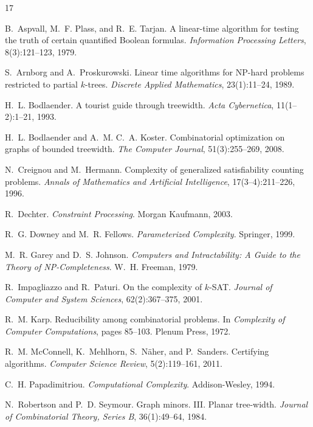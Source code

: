 \documentclass[11pt]{article}
\theoremstyle{plain}
\theoremstyle{definition}
\theoremstyle{remark}
\begin{document}
\begin{thebibliography}{17}

 B.~Aspvall, M.~F. Plass, and R.~E. Tarjan.
A linear-time algorithm for testing the truth of certain quantified Boolean
formulas. \emph{Information Processing Letters}, 8(3):121--123, 1979.

 S.~Arnborg and A.~Proskurowski.
Linear time algorithms for NP-hard problems restricted to partial $k$-trees.
\emph{Discrete Applied Mathematics}, 23(1):11--24, 1989.

 H.~L. Bodlaender.
A tourist guide through treewidth. \emph{Acta Cybernetica},
11(1--2):1--21, 1993.

 H.~L. Bodlaender and A.~M. C.~A. Koster.
Combinatorial optimization on graphs of bounded treewidth.
\emph{The Computer Journal}, 51(3):255--269, 2008.

 N.~Creignou and M.~Hermann.
Complexity of generalized satisfiability counting problems.
\emph{Annals of Mathematics and Artificial Intelligence}, 17(3--4):211--226,
1996.

 R.~Dechter. \emph{Constraint Processing}.
Morgan Kaufmann, 2003.

 R.~G. Downey and M.~R. Fellows.
\emph{Parameterized Complexity}. Springer, 1999.

 M.~R. Garey and D.~S. Johnson.
\emph{Computers and Intractability: A Guide to the Theory of
NP-Completeness}. W.~H. Freeman, 1979.

 R.~Impagliazzo and R.~Paturi.
On the complexity of $k$-SAT. \emph{Journal of Computer and System
Sciences}, 62(2):367--375, 2001.

 R.~M. Karp. Reducibility among combinatorial problems.
In \emph{Complexity of Computer Computations}, pages 85--103. Plenum Press,
1972.

 R.~M. McConnell, K.~Mehlhorn, S.~N\"aher, and P.~Sanders.
Certifying algorithms. \emph{Computer Science Review}, 5(2):119--161, 2011.

 C.~H. Papadimitriou. \emph{Computational
Complexity}. Addison-Wesley, 1994.

 N.~Robertson and P.~D. Seymour.
Graph minors. III. Planar tree-width. \emph{Journal of Combinatorial Theory,
Series B}, 36(1):49--64, 1984.


\end{thebibliography}
\end{document}
